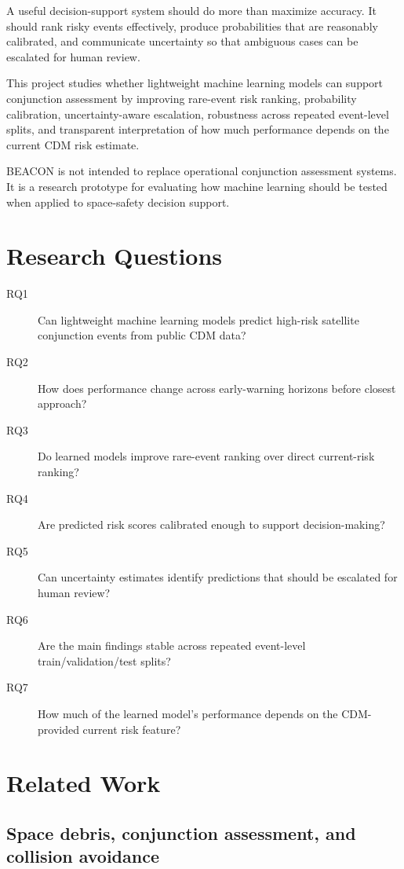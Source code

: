 \documentclass[11pt]{article}
\begin{document}
A useful decision-support system should do more than maximize accuracy. It should rank risky events effectively, produce probabilities that are reasonably calibrated, and communicate uncertainty so that ambiguous cases can be escalated for human review.

This project studies whether lightweight machine learning models can support conjunction assessment by improving rare-event risk ranking, probability calibration, uncertainty-aware escalation, robustness across repeated event-level splits, and transparent interpretation of how much performance depends on the current CDM risk estimate.

BEACON is not intended to replace operational conjunction assessment systems. It is a research prototype for evaluating how machine learning should be tested when applied to space-safety decision support.

\section{Research Questions}

\begin{description}
    \item[RQ1] Can lightweight machine learning models predict high-risk satellite conjunction events from public CDM data?
    \item[RQ2] How does performance change across early-warning horizons before closest approach?
    \item[RQ3] Do learned models improve rare-event ranking over direct current-risk ranking?
    \item[RQ4] Are predicted risk scores calibrated enough to support decision-making?
    \item[RQ5] Can uncertainty estimates identify predictions that should be escalated for human review?
    \item[RQ6] Are the main findings stable across repeated event-level train/validation/test splits?
    \item[RQ7] How much of the learned model's performance depends on the CDM-provided current risk feature?
\end{description}

\section{Related Work}

\subsection{Space debris, conjunction assessment, and collision avoidance}
\end{document}
